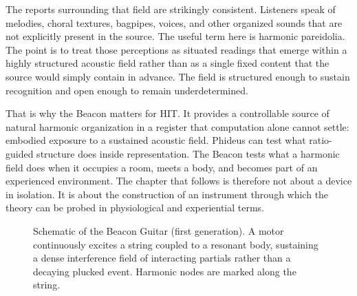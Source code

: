 The reports surrounding that field are strikingly consistent. Listeners speak of melodies, choral textures, bagpipes, voices, and other organized sounds that are not explicitly present in the source. The useful term here is harmonic pareidolia. The point is to treat those perceptions as situated readings that emerge within a highly structured acoustic field rather than as a single fixed content that the source would simply contain in advance. The field is structured enough to sustain recognition and open enough to remain underdetermined.

That is why the Beacon matters for HIT. It provides a controllable source of natural harmonic organization in a register that computation alone cannot settle: embodied exposure to a sustained acoustic field. Phideus can test what ratio-guided structure does inside representation. The Beacon tests what a harmonic field does when it occupies a room, meets a body, and becomes part of an experienced environment. The chapter that follows is therefore not about a device in isolation. It is about the construction of an instrument through which the theory can be probed in physiological and experiential terms.

\begin{figure}[ht]
\centering
{}
\caption{Schematic of the Beacon Guitar (first generation). A motor continuously excites a string coupled to a resonant body, sustaining a dense interference field of interacting partials rather than a decaying plucked event. Harmonic nodes are marked along the string.}
\label{fig:beacon_device}
\end{figure}


